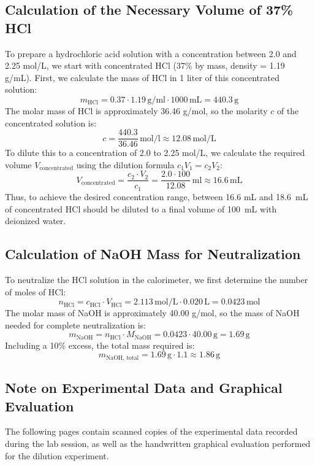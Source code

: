 \documentclass[a4paper,12pt]{article}
\begin{document}
\subsection*{Calculation of the Necessary Volume of 37\% HCl}
To prepare a hydrochloric acid solution with a concentration between 2.0 and 2.25 mol/L, we start with concentrated HCl (37\% by mass, density = 1.19 g/mL). First, we calculate the mass of HCl in 1 liter of this concentrated solution:
\[
m_{\text{HCl}} = 0.37 \cdot 1.19\,\si{\gram\per\milli\litre} \cdot 1000 \, \text{mL} = 440.3 \, \text{g}
\]
The molar mass of HCl is approximately 36.46 g/mol, so the molarity \( c \) of the concentrated solution is:
\[
c = \frac{440.3}{36.46} \,\si{\mol\per\litre}\approx 12.08 \, \text{mol/L}
\]
To dilute this to a concentration of 2.0 to 2.25 mol/L, we calculate the required volume \( V_{\text{concentrated}} \) using the dilution formula \( c_1 V_1 = c_2 V_2 \):
\[
V_{\text{concentrated}} = \frac{c_2 \cdot V_2}{c_1} = \frac{2.0 \cdot 100}{12.08} \,\si{\milli\litre}\approx 16.6 \, \text{mL}
\]
Thus, to achieve the desired concentration range, between 16.6 mL and 18.6~mL of concentrated HCl should be diluted to a final volume of 100~mL with deionized water.

\subsection*{Calculation of NaOH Mass for Neutralization}
To neutralize the HCl solution in the calorimeter, we first determine the number of moles of HCl:
\[
n_{\text{HCl}} = c_{\text{HCl}} \cdot V_{\text{HCl}} = 2.113 \, \text{mol/L} \cdot 0.020 \, \text{L} = 0.0423 \, \text{mol}
\]
The molar mass of NaOH is approximately 40.00 g/mol, so the mass of NaOH needed for complete neutralization is:
\[
m_{\text{NaOH}} = n_{\text{HCl}} \cdot M_{\text{NaOH}} = 0.0423 \cdot 40.00 \,\si{\gram}= 1.69 \, \text{g}
\]
Including a 10\% excess, the total mass required is:
\[
m_{\text{NaOH, total}} = 1.69\,\si{\gram} \cdot 1.1 \approx 1.86 \, \text{g}
\]

\subsection*{Note on Experimental Data and Graphical Evaluation}
The following pages contain scanned copies of the experimental data recorded during the lab session, as well as the handwritten graphical evaluation performed for the dilution experiment.
\end{document}
